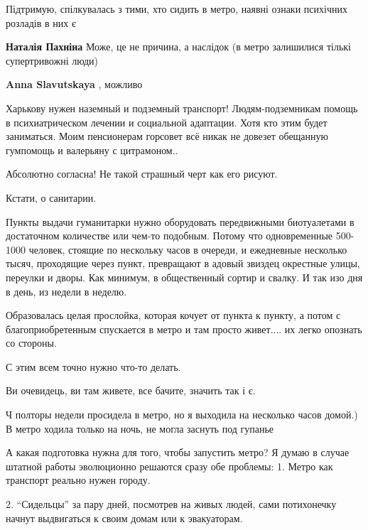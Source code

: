 \begin{itemize}
\begin{itemize}
\end{itemize} %

Підтримую, спілкувалась з тими, хто сидить в метро, наявні ознаки психічних розладів в них є

\textbf{Наталія Пахніна} Може, це не причина, а наслідок (в метро залишилися тількі супертривожні люди)

\textbf{Anna Slavutskaya} , можливо


Харькову нужен наземный и подземный транспорт! Людям-подземникам помощь в
психиатрическом лечении и социальной адаптации. Хотя кто этим будет заниматься.
Моим пенсионерам горсовет всё никак не довезет обещанную гумпомощь и валерьяну
с цитрамоном..

Абсолютно согласна! Не такой страшный черт как его рисуют.


Кстати, о санитарии.

Пункты выдачи гуманитарки нужно оборудовать передвижными биотуалетами в
достаточном количестве или чем-то подобным. Потому что одновременные 500-1000
человек, стоящие по нескольку часов в очереди, и ежедневные несколько тысяч,
проходящие через пункт, превращают в адовый звиздец окрестные улицы, переулки и
дворы. Как минимум, в общественный сортир и свалку. И так изо дня в день, из
недели в неделю.

Образовалась целая прослойка, которая кочует от пункта к пункту, а потом с
благоприобретенным спускается в метро и там просто живет.... их легко опознать
со стороны.

С этим всем точно нужно что-то делать.

Ви очевидець, ви там живете, все бачите, значить так і є.


Ч полторы недели просидела в метро, но я выходила на несколько часов домой.) В
метро ходила только на ночь, не могла заснуть под гупанье


А какая подготовка нужна для того, чтобы запустить метро? Я думаю в случае
штатной работы эволюционно решаются сразу обе проблемы: 1. Метро как транспорт
реально нужен городу. 

2. \enquote{Сидельцы} за пару дней, посмотрев на живых людей, сами потихонечку
начнут выдвигаться к своим домам или к эвакуаторам.


\end{itemize}
